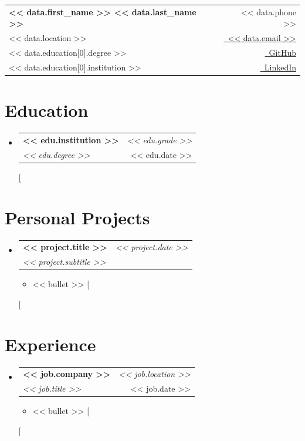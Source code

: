 \documentclass[a4paper,11pt]{article}
\makeatletter
\newcommand{\resumeSubheading}[4]{\vspace{0.5mm}\item\begin{tabular*}{0.98\textwidth}[t]{l@{\extracolsep{\fill}}r}\textbf{#1} & \textit{\footnotesize{#4}} \\\textit{\footnotesize{#3}} &  \footnotesize{#2}\\\end{tabular*}\vspace{-2.4mm}}
\newcommand{\resumeProject}[4]{\vspace{0.5mm}\item\begin{tabular*}{0.98\textwidth}[t]{l@{\extracolsep{\fill}}r}\textbf{#1} & \textit{\footnotesize{#3}} \\\footnotesize{\textit{#2}} & \footnotesize{#4}\end{tabular*}\vspace{-2.4mm}}
\newcommand{\resumeSubHeadingListStart}{\begin{itemize}[leftmargin=*,labelsep=0mm]}
\newcommand{\resumeItemListStart}{\begin{justify}\begin{itemize}[leftmargin=3ex, rightmargin=2ex, noitemsep,labelsep=1.2mm,itemsep=0mm]\small}
\newcommand{\resumeSubHeadingListEnd}{\end{itemize}\vspace{2mm}}
\newcommand{\resumeItemListEnd}{\end{itemize}\end{justify}\vspace{-2mm}}
\makeatother
\begin{document}
\selectfont
\begin{tabularx}{\linewidth}{L r} \\
  \textbf{\Large << data.first_name >> << data.last_name >>} & \raisebox{0.0\height}{\footnotesize \faPhone}\ << data.phone >>\\
  << data.location >> & \href{mailto:<< data.email >>}{\raisebox{0.0\height}{\footnotesize \faEnvelope}\ << data.email >>} \\
  << data.education[0].degree >> & \href{https://<< data.github >>}{\raisebox{0.0\height}{\footnotesize \faGithub}\ GitHub} \\  
  << data.education[0].institution >> & \href{https://<< data.linkedin >>}{\raisebox{0.0\height}{\footnotesize \faLinkedin}\ LinkedIn}
\end{tabularx}

\section{\textbf{Education}}
  \resumeSubHeadingListStart
    [%
    \resumeSubheading{<< edu.institution >>}{<< edu.date >>}{<< edu.degree >>}{<< edu.grade >>}
    [%
  \resumeSubHeadingListEnd
\vspace{-5.5mm}

\section{\textbf{Personal Projects}}
  \resumeSubHeadingListStart
    [%
    \resumeProject{<< project.title >>}{<< project.subtitle >>}{<< project.date >>}{}
      \resumeItemListStart
        [%
        \item {<< bullet >>}
        [%
      \resumeItemListEnd
    \vspace{-2mm}
    [%
  \resumeSubHeadingListEnd
\vspace{-8.5mm}

\section{\textbf{Experience}}
  \resumeSubHeadingListStart
    [%
    \resumeSubheading{<< job.company >>}{<< job.date >>}{<< job.title >>}{<< job.location >>}
      \vspace{-2.0mm}
      \resumeItemListStart
        [%
        \item {<< bullet >>}
        [%
      \resumeItemListEnd
    \vspace{-3.0mm}
    [%
  \resumeSubHeadingListEnd
\vspace{-5.5mm}
\end{document}

